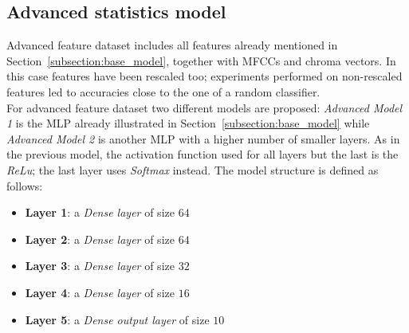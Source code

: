 \documentclass[oneside,openany]{article}
\begin{document}
    \subsection{Advanced statistics model}
    \label{subsection:adv_model}
    Advanced feature dataset includes all features already mentioned in Section~\ref{subsection:base_model}, together with MFCCs and chroma vectors. In this case features have been rescaled too; experiments performed on non-rescaled features led to accuracies close to the one of a random classifier. \\
    For advanced feature dataset two different models are proposed: \textit{Advanced Model 1} is the MLP already illustrated in Section~\ref{subsection:base_model} while \textit{Advanced Model 2} is another MLP with a higher number of smaller layers. As in the previous model, the activation function used for all layers but the last is the \textit{ReLu}; the last layer uses \textit{Softmax} instead. The model structure is defined as follows:
    \begin{itemize}
    \item \textbf{Layer 1}: a \textit{Dense layer} of size $64$
    \item \textbf{Layer 2}: a \textit{Dense layer} of size $64$
    \item \textbf{Layer 3}: a \textit{Dense layer} of size $32$
    \item \textbf{Layer 4}: a \textit{Dense layer} of size $16$
    \item \textbf{Layer 5}: a \textit{Dense output layer} of size $10$
    \end{itemize}
    
\end{document}
